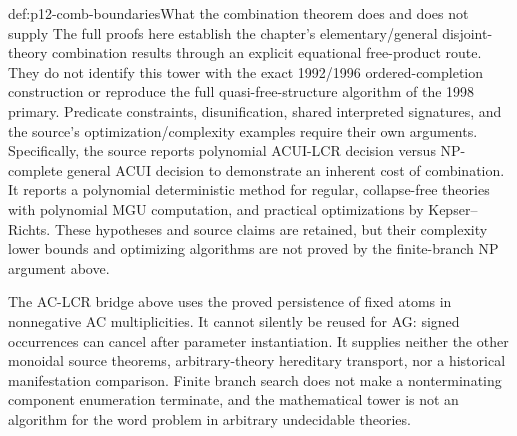 \begin{proofboundary}{def:p12-comb-boundaries}{What the combination theorem does and does not supply}
The full proofs here establish the chapter's elementary/general
disjoint-theory combination results through an explicit equational
free-product route. They do not identify this tower with the exact
1992/1996 ordered-completion construction or reproduce the full
quasi-free-structure algorithm of the 1998 primary. Predicate constraints,
disunification, shared interpreted signatures, and the source's
optimization/complexity examples require their own arguments.
Specifically, the source reports polynomial ACUI-LCR decision versus
NP-complete general ACUI decision to demonstrate an inherent cost of
combination. It reports a polynomial deterministic method for regular,
collapse-free theories with polynomial MGU computation, and practical
optimizations by Kepser--Richts. These hypotheses and source claims
are retained, but their complexity lower bounds and optimizing
algorithms are not proved by the finite-branch NP argument above.
\cite[pp.~516--517]{BaaderSnyder2001}

The AC-LCR bridge above uses the proved persistence of fixed atoms in
nonnegative AC multiplicities. It cannot silently be reused for AG:
signed occurrences can cancel after parameter instantiation. It supplies
neither the other monoidal source theorems, arbitrary-theory hereditary
transport, nor a historical manifestation comparison. Finite branch search
does not make a nonterminating component enumeration terminate, and
the mathematical tower is not an algorithm for the word problem in
arbitrary undecidable theories.
\end{proofboundary}
